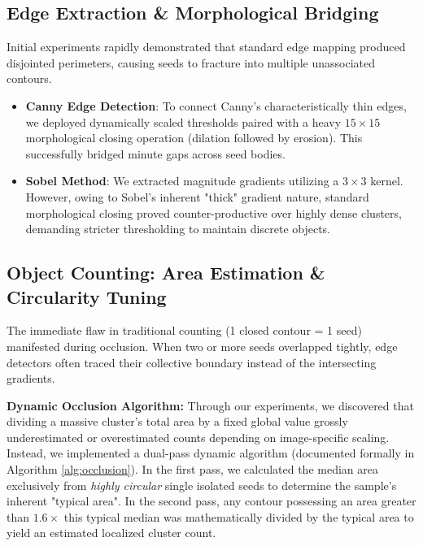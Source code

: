 \documentclass[11pt]{article}
\begin{document}
\subsection{Edge Extraction \& Morphological Bridging}
Initial experiments rapidly demonstrated that standard edge mapping produced disjointed perimeters, causing seeds to fracture into multiple unassociated contours.
\begin{itemize}
    \item \textbf{Canny Edge Detection}: To connect Canny's characteristically thin edges, we deployed dynamically scaled thresholds paired with a heavy $15\times15$ morphological closing operation (dilation followed by erosion). This successfully bridged minute gaps across seed bodies.
    \item \textbf{Sobel Method}: We extracted magnitude gradients utilizing a $3\times3$ kernel. However, owing to Sobel's inherent "thick" gradient nature, standard morphological closing proved counter-productive over highly dense clusters, demanding stricter thresholding to maintain discrete objects.
\end{itemize}

\subsection{Object Counting: Area Estimation \& Circularity Tuning}
The immediate flaw in traditional counting (1 closed contour = 1 seed) manifested during occlusion. When two or more seeds overlapped tightly, edge detectors often traced their collective boundary instead of the intersecting gradients. 

\textbf{Dynamic Occlusion Algorithm:} Through our experiments, we discovered that dividing a massive cluster's total area by a fixed global value grossly underestimated or overestimated counts depending on image-specific scaling. Instead, we implemented a dual-pass dynamic algorithm (documented formally in Algorithm \ref{alg:occlusion}). In the first pass, we calculated the median area exclusively from \textit{highly circular} single isolated seeds to determine the sample's inherent "typical area". In the second pass, any contour possessing an area greater than $1.6\times$ this typical median was mathematically divided by the typical area to yield an estimated localized cluster count. 
\end{document}
